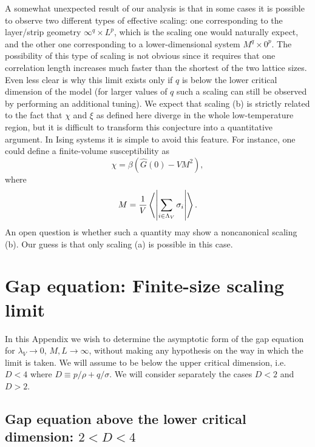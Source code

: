 \documentclass[a4paper,12pt]{article}
\begin{document}
A somewhat unexpected result of our analysis is that in some cases it is 
possible to observe two different types of effective scaling:
one corresponding to 
the layer/strip geometry $\infty^q\times L^p$, which is the scaling 
one would naturally expect, and the other one corresponding to 
a lower-dimensional system $M^q \times 0^p$. The possibility of this type 
of scaling is not obvious since it requires that one correlation length 
increases much faster than the shortest of the two lattice sizes. 
Even less clear is why this limit exists only if $q$ is below the 
lower critical dimension of the model (for larger values of $q$ 
such a scaling can still be observed by performing an additional tuning).
We expect that scaling (b) is strictly related to the fact that 
$\chi$ and $\xi$ as defined 
here  diverge in the whole low-temperature region, but it is 
difficult to transform this conjecture into a quantitative argument.
In Ising systems it is simple to avoid this feature. 
For instance, one could define a finite-volume susceptibility as 
\begin{equation}
\chi = \beta (\widehat{G}(0) - V M^2),
\end{equation}
where 
\begin{equation} 
M  = {1\over V} \left \langle \left |\sum_{i\in\Lambda_V}
       \sigma_i\right|\right\rangle.
\end{equation}
An open question is whether such a quantity may show a noncanonical scaling (b).
Our guess is that only scaling (a) is possible in this case.






\appendix
\section{Gap equation: Finite-size scaling limit} \label{AppA}

In this Appendix we wish to determine the asymptotic form of the
gap equation for $\lambda_V\to 0$, $M,L\to \infty$, without
making any hypothesis on the way in which the limit is taken.
We will assume to be below the
upper critical dimension, i.e. $D<4$ where $D\equiv p/\rho + q/\sigma$.
We will consider separately the cases $D<2$ and $D>2$.

\subsection{Gap equation above the lower critical dimension: 
$2 < D < 4$} \label{AppA.1}
\end{document}
